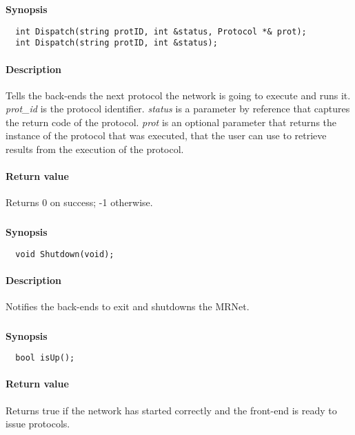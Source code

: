 \documentclass[twoside,a4,english,11pt]{book}
\begin{document}
\textbf{Synopsis}
\begin{lstlisting}
  int Dispatch(string protID, int &status, Protocol *& prot);
  int Dispatch(string protID, int &status);
\end{lstlisting}

\paragraph{Description}
  Tells the back-ends the next protocol the network is going to execute and runs it.
  \emph{prot\_id} is the protocol identifier. \emph{status} is a parameter by reference that 
  captures the return code of the protocol. \emph{prot} is an optional parameter that 
  returns the instance of the protocol that was executed, that the user can 
  use to retrieve results from the execution of the protocol.

\paragraph{Return value}
  Returns 0 on success; -1 otherwise.

\subsubsection{}

\textbf{Synopsis}
\begin{lstlisting}
  void Shutdown(void);
\end{lstlisting}

\paragraph{Description}
  Notifies the back-ends to exit and shutdowns the MRNet.
 
\subsubsection{}

\textbf{Synopsis}
\begin{lstlisting}
  bool isUp();
\end{lstlisting}

\paragraph{Return value}
  Returns true if the network has started correctly and the front-end is ready to issue 
  protocols.
\end{document}
